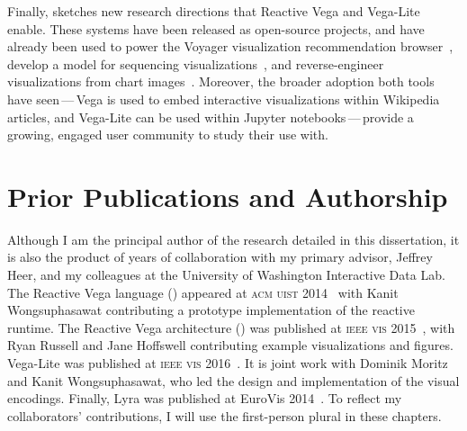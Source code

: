 Finally,  sketches new research directions that Reactive
Vega and Vega-Lite enable. These systems have been released as open-source
projects, and have already been used to power the Voyager visualization
recommendation browser~\cite{voyager,voyager2,compassql}, develop a model for
sequencing visualizations~\cite{kim:graphscape}, and reverse-engineer
visualizations from chart images~\cite{poco:reverse}. Moreover, the broader
adoption both tools have seen\,---\,Vega is used to embed interactive
visualizations within Wikipedia articles, and Vega-Lite can be used within
Jupyter notebooks\,---\,provide a growing, engaged user community to study their
use with.

\vspace{-20pt}

\section{Prior Publications and Authorship}

\vspace{-10pt}

Although I am the principal author of the research detailed in this
dissertation, it is also the product of years of collaboration with my primary
advisor, Jeffrey Heer, and my colleagues at the University of Washington
Interactive Data Lab. The Reactive Vega language () appeared
at \textsc{acm uist} 2014~\cite{reactive-vega-model} with Kanit
Wongsuphasawat contributing a prototype implementation of the reactive runtime.
The Reactive Vega architecture () was published at
\textsc{ieee vis} 2015~\cite{reactive-vega-arch}, with Ryan Russell and Jane
Hoffswell contributing example visualizations and figures. Vega-Lite was
published at \textsc{ieee vis} 2016~\cite{vega-lite}. It is joint work with
Dominik Moritz and Kanit Wongsuphasawat, who led the design and implementation
of the visual encodings. Finally, Lyra was published at EuroVis
2014~\cite{lyra}. To reflect my collaborators' contributions, I will use the
first-person plural in these chapters.